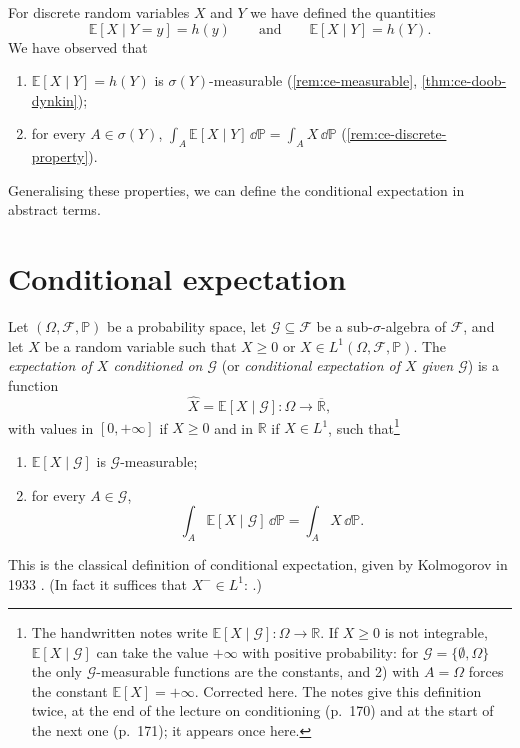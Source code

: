 \begin{remark}[Summing up]\label{rem:ce-summary}
For discrete random variables $X$ and $Y$ we have defined the quantities
\[
  \mathbb E[X\mid Y=y]=h(y)\qquad\text{and}\qquad\mathbb E[X\mid Y]=h(Y).
\]
We have observed that
\begin{enumerate}[label=\arabic*)]
  \item $\mathbb E[X\mid Y]=h(Y)$ is $\sigma(Y)$-measurable (\cref{rem:ce-measurable},
    \cref{thm:ce-doob-dynkin});
  \item for every $A\in\sigma(Y)$,
    $\displaystyle\int_A\mathbb E[X\mid Y]\,\dd\mathbb P=\int_AX\,\dd\mathbb P$
    (\cref{rem:ce-discrete-property}).
\end{enumerate}
\end{remark}

Generalising these properties, we can define the conditional expectation in abstract terms.

\section{Conditional expectation}\label{sec:ce-conditional-expectation}

\begin{definition}\label{def:ce-conditional-expectation}
Let $(\Omega,\mathcal F,\mathbb P)$ be a probability space, let $\mathcal G\subseteq\mathcal F$
be a sub-$\sigma$-algebra of $\mathcal F$, and let $X$ be a random variable such that $X\ge0$
or $X\in L^1(\Omega,\mathcal F,\mathbb P)$. The \emph{expectation of $X$ conditioned on
$\mathcal G$} (or \emph{conditional expectation of $X$ given $\mathcal G$}) is a function
\[
  \hat X=\mathbb E[X\mid\mathcal G]:\Omega\to\overline{\mathbb R},
\]
with values in $[0,+\infty]$ if $X\ge0$ and in $\mathbb R$ if $X\in L^1$, such
that\footnote{The handwritten notes write $\mathbb E[X\mid\mathcal G]:\Omega\to\mathbb R$. If
$X\ge0$ is not integrable, $\mathbb E[X\mid\mathcal G]$ can take the value $+\infty$ with
positive probability: for $\mathcal G=\{\emptyset,\Omega\}$ the only $\mathcal G$-measurable
functions are the constants, and 2) with $A=\Omega$ forces the constant $\mathbb E[X]=+\infty$.
Corrected here. The notes give this definition twice, at the end of the lecture on conditioning
(p.~170) and at the start of the next one (p.~171); it appears once here.}
\begin{enumerate}[label=\arabic*)]
  \item $\mathbb E[X\mid\mathcal G]$ is $\mathcal G$-measurable;
  \item for every $A\in\mathcal G$,
    \[
      \int_A\mathbb E[X\mid\mathcal G]\,\dd\mathbb P=\int_AX\,\dd\mathbb P .
    \]
\end{enumerate}
This is the classical definition of conditional expectation, given by Kolmogorov in
1933 \citep{kolmogorov-1933}. (In fact it suffices that $X^-\in L^1$:
.)
\end{definition}

